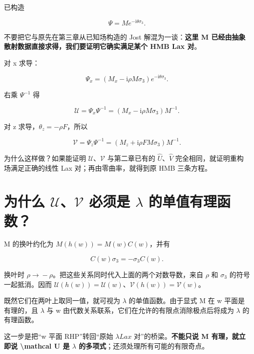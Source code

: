 已构造\par

\[
\Psi=M e^{-\mathrm{i}\theta\sigma_3}.
\]

不要把它与原先在第三章从已知场构造的 Jost 解混为一谈：\textbf{这里 M 已经由抽象散射数据直接求得，我们要证明它确实满足某个 HMB Lax 对}。\par

对 x 求导：\par

\[
\Psi_x=
(M_x-\mathrm{i}\rho M\sigma_3)e^{-\mathrm{i}\theta\sigma_3}.
\]

右乘 $\Psi{}^{-1}$ 得\par

\[
\boxed{
\mathcal U=\Psi_x\Psi^{-1}
=(M_x-\mathrm{i}\rho M\sigma_3)M^{-1}.
}
\]

对 z 求导，$\theta{}_z=-\rho{}F$，所以\par

\[
\boxed{
\mathcal V=\Psi_z\Psi^{-1}
=(M_z+\mathrm{i}\rho F M\sigma_3)M^{-1}.
}
\]

为什么这样做？如果能证明 $\mathcal U$、$\mathcal V$ 与第二章已有的 $\widehat U$、$\widehat V$ 完全相同，就证明重构场满足正确的线性 Lax 对；再由零曲率，就得到原 HMB 三条方程。\par

\section{为什么 \texorpdfstring{$\mathcal{U}$、$\mathcal{V}$}{U, V} 必须是 \texorpdfstring{$\lambda$}{lambda} 的单值有理函数？}

M 的换叶约化为 $M(h(w))=M(w)C(w)$，并有\par

\[
C(w)\sigma_3=-\sigma_3 C(w).
\]

换叶时 $\rho{}\to{}-\rho{}$。把这些关系同时代入上面的两个对数导数，来自 $\rho{}$ 和 $\sigma{}_{3}$ 的符号一起抵消。因而 $\mathcal U(h(w))=\mathcal U(w)$、$\mathcal V(h(w))=\mathcal V(w)$。\par

既然它们在两叶上取同一值，就可视为 $\lambda{}$ 的单值函数。由于显式 M 在 w 平面是有理的，且 $\lambda{}$ 与 w 由代数关系联系，它们在允许的有限点消除极点后将成为 $\lambda{}$ 的有理函数。\par

这一步是把“w 平面 RHP”转回“原始 $\lambda{} Lax$ 对”的桥梁。\textbf{不能只说 M 有理，就立即说 \textbackslash{}mathcal U 是 \ensuremath{\lambda} 的多项式}；还须处理所有可能的有限奇点。\par

